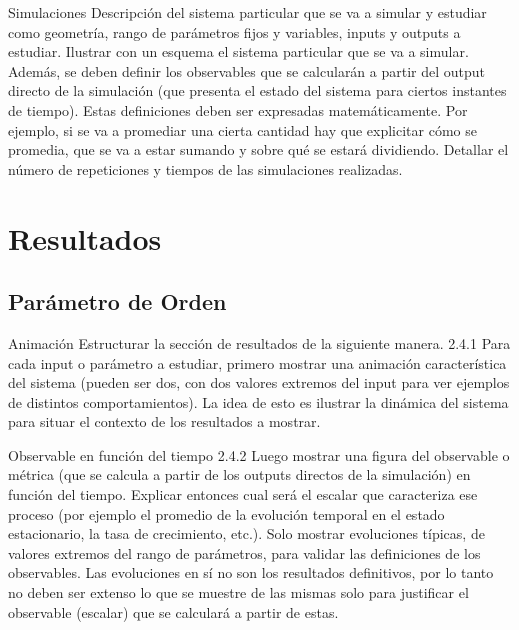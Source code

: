 \documentclass{beamer}
\begin{document}
    \begin{frame}{Simulaciones}
        Descripción del sistema particular que se va a simular y estudiar como
        geometría, rango de parámetros fijos y variables, inputs y outputs a estudiar. Ilustrar con un
        esquema el sistema particular que se va a simular.
        Además, se deben definir los observables que se calcularán a partir del output directo de la
        simulación (que presenta el estado del sistema para ciertos instantes de tiempo). Estas
        definiciones deben ser expresadas matemáticamente. Por ejemplo, si se va a promediar una cierta
        cantidad hay que explicitar cómo se promedia, que se va a estar sumando y sobre qué se estará
        dividiendo.
        Detallar el número de repeticiones y tiempos de las simulaciones realizadas.
    \end{frame}

    \section{Resultados}

    \subsection[Parámetro de Orden]{Parámetro de Orden}

    \begin{frame}{Animación}
        Estructurar la sección de resultados de la siguiente manera.
        2.4.1 Para cada input o parámetro a estudiar, primero mostrar una animación característica del
        sistema (pueden ser dos, con dos valores extremos del input para ver ejemplos de distintos
        comportamientos). La idea de esto es ilustrar la dinámica del sistema para situar el contexto de los
        resultados a mostrar.
    \end{frame}

    \begin{frame}{Observable en función del tiempo}
        2.4.2 Luego mostrar una figura del observable o métrica (que se calcula a partir de los outputs
        directos de la simulación) en función del tiempo. Explicar entonces cual será el escalar que
        caracteriza ese proceso (por ejemplo el promedio de la evolución temporal en el estado
        estacionario, la tasa de crecimiento, etc.). Solo mostrar evoluciones típicas, de valores extremos
        del rango de parámetros, para validar las definiciones de los observables. Las evoluciones en sí
        no son los resultados definitivos, por lo tanto no deben ser extenso lo que se muestre de las
        mismas solo para justificar el observable (escalar) que se calculará a partir de estas.
    \end{frame}
\end{document}
